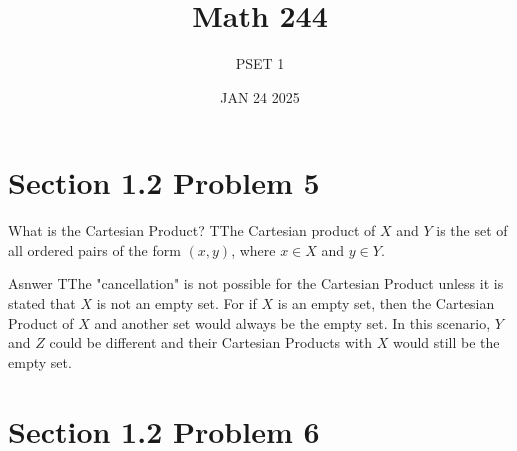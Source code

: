 \documentclass{report}
\title{\Huge{Math 244}}
\author{\huge{PSET 1}}
\date{JAN 24 2025}
\begin{document}
\maketitle
\newpage%
\tableofcontents
\pagebreak

\section*{Section 1.2 Problem 5}


\begin{RemarkWithLily}{What is the Cartesian Product?}
    TThe Cartesian product of $X$ and $Y$ is the set of all ordered pairs of the form $(x,y)$, where $x \in X$ and $y \in Y$. 
\end{RemarkWithLily}

\begin{RemarkWithLily}{Asnwer}
    TThe "cancellation" is not possible for the Cartesian Product unless it is stated that $X$ is not an empty set. For if $X$ is an empty set, then the Cartesian Product of $X$ and 
    another set would always be the empty set. In this scenario, $Y$ and $Z$ could be different and their Cartesian Products with $X$ would still be the empty set.
\end{RemarkWithLily}

\section*{Section 1.2 Problem 6}

\end{document}
